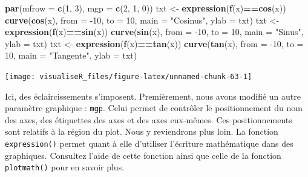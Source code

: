 \documentclass[]{article}
\newenvironment{Shaded}{\begin{snugshade}}{\end{snugshade}}
\newcommand{\DataTypeTok}[1]{\textcolor[rgb]{0.13,0.29,0.53}{#1}}
\newcommand{\DecValTok}[1]{\textcolor[rgb]{0.00,0.00,0.81}{#1}}
\newcommand{\KeywordTok}[1]{\textcolor[rgb]{0.13,0.29,0.53}{\textbf{#1}}}
\newcommand{\NormalTok}[1]{#1}
\newcommand{\OperatorTok}[1]{\textcolor[rgb]{0.81,0.36,0.00}{\textbf{#1}}}
\newcommand{\StringTok}[1]{\textcolor[rgb]{0.31,0.60,0.02}{#1}}
\begin{document}
\begin{Shaded}
\begin{Highlighting}[]
\KeywordTok{par}\NormalTok{(}\DataTypeTok{mfrow =} \KeywordTok{c}\NormalTok{(}\DecValTok{1}\NormalTok{, }\DecValTok{3}\NormalTok{), }\DataTypeTok{mgp =} \KeywordTok{c}\NormalTok{(}\DecValTok{2}\NormalTok{, }\DecValTok{1}\NormalTok{, }\DecValTok{0}\NormalTok{))}
\NormalTok{txt <-}\StringTok{ }\KeywordTok{expression}\NormalTok{(}\KeywordTok{f}\NormalTok{(x)}\OperatorTok{==}\KeywordTok{cos}\NormalTok{(x))}
\KeywordTok{curve}\NormalTok{(}\KeywordTok{cos}\NormalTok{(x), }\DataTypeTok{from =} \DecValTok{-10}\NormalTok{, }\DataTypeTok{to =} \DecValTok{10}\NormalTok{, }\DataTypeTok{main =} \StringTok{"Cosinus"}\NormalTok{, }\DataTypeTok{ylab =}\NormalTok{ txt)}
\NormalTok{txt <-}\StringTok{ }\KeywordTok{expression}\NormalTok{(}\KeywordTok{f}\NormalTok{(x)}\OperatorTok{==}\KeywordTok{sin}\NormalTok{(x))}
\KeywordTok{curve}\NormalTok{(}\KeywordTok{sin}\NormalTok{(x), }\DataTypeTok{from =} \DecValTok{-10}\NormalTok{, }\DataTypeTok{to =} \DecValTok{10}\NormalTok{, }\DataTypeTok{main =} \StringTok{"Sinus"}\NormalTok{, }\DataTypeTok{ylab =}\NormalTok{ txt)}
\NormalTok{txt <-}\StringTok{ }\KeywordTok{expression}\NormalTok{(}\KeywordTok{f}\NormalTok{(x)}\OperatorTok{==}\KeywordTok{tan}\NormalTok{(x))}
\KeywordTok{curve}\NormalTok{(}\KeywordTok{tan}\NormalTok{(x), }\DataTypeTok{from =} \DecValTok{-10}\NormalTok{, }\DataTypeTok{to =} \DecValTok{10}\NormalTok{, }\DataTypeTok{main =} \StringTok{"Tangente"}\NormalTok{, }\DataTypeTok{ylab =}\NormalTok{ txt)}
\end{Highlighting}
\end{Shaded}

\begin{center}\texttt{[image: visualiseR\_files/figure-latex/unnamed-chunk-63-1]} \end{center}

Ici, des éclaircissements s'imposent. Premièrement, nous avons modifié un autre paramètre graphique : \texttt{mgp}. Celui permet de contrôler le positionnement du nom des axes, des étiquettes des axes et des axes eux-mêmes. Ces positionnements sont relatifs à la région du plot. Nous y reviendrons plus loin.
La fonction \texttt{expression()} permet quant à elle d'utiliser l'écriture mathématique dans des graphiques. Consultez l'aide de cette fonction ainsi que celle de la fonction \texttt{plotmath()} pour en savoir plus.
\end{document}
